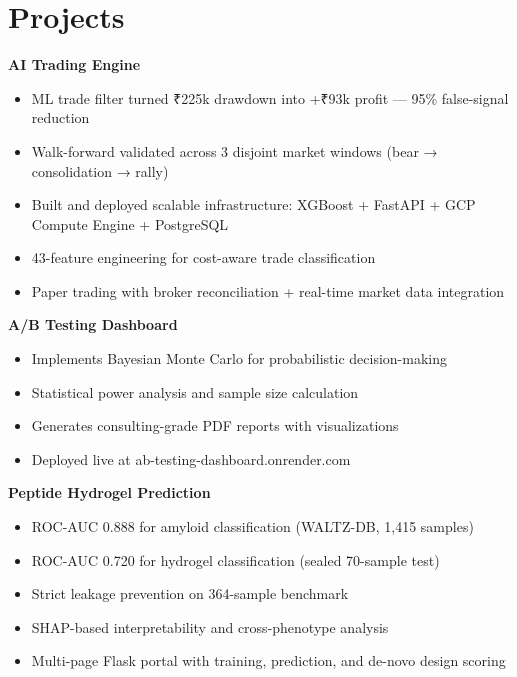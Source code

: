 \documentclass[11pt,a4paper]{article}
\begin{document}
\section*{Projects}
\noindent\textbf{AI Trading Engine} \hfill \href{https://github.com/jiyanshusingh/trading-engine}{\faGithub}
\begin{itemize}
    \item ML trade filter turned ₹225k drawdown into +₹93k profit — 95\% false-signal reduction
    \item Walk-forward validated across 3 disjoint market windows (bear → consolidation → rally)
    \item Built and deployed scalable infrastructure: XGBoost + FastAPI + GCP Compute Engine + PostgreSQL
    \item 43-feature engineering for cost-aware trade classification
    \item Paper trading with broker reconciliation + real-time market data integration
\end{itemize}

\noindent\textbf{A/B Testing Dashboard} \hfill \href{https://ab-testing-dashboard.onrender.com}{\faGlobe} \href{https://github.com/jiyanshusingh/ab-testing-dashboard}{\faGithub}
\begin{itemize}
    \item Implements Bayesian Monte Carlo for probabilistic decision-making
    \item Statistical power analysis and sample size calculation
    \item Generates consulting-grade PDF reports with visualizations
    \item Deployed live at ab-testing-dashboard.onrender.com
\end{itemize}

\noindent\textbf{Peptide Hydrogel Prediction} \hfill \href{https://peptide-hydrogel-portal.onrender.com}{\faGlobe} \href{https://github.com/jiyanshusingh/hydrogel_project}{\faGithub}
\begin{itemize}
    \item ROC-AUC 0.888 for amyloid classification (WALTZ-DB, 1,415 samples)
    \item ROC-AUC 0.720 for hydrogel classification (sealed 70-sample test)
    \item Strict leakage prevention on 364-sample benchmark
    \item SHAP-based interpretability and cross-phenotype analysis
    \item Multi-page Flask portal with training, prediction, and de-novo design scoring
\end{itemize}
\end{document}
